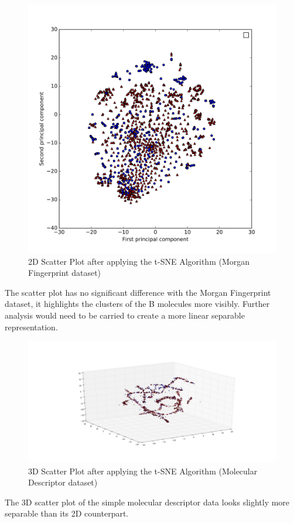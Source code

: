 \documentclass[a4paper,12pt]{report}
\begin{document}
		\begin{figure}[H]
			\centering
			\includegraphics[width=\textwidth,scale=1,totalheight=0.5\textheight]{images/scatter_tsne_mfps}
			\caption{2D Scatter Plot after applying the t-SNE Algorithm (Morgan Fingerprint dataset)}
			\label{fig:scatter_tsne_mfps_2D}
		\end{figure}
		The scatter plot has no significant difference with the Morgan Fingerprint dataset, it highlights the clusters of the B molecules more visibly. Further analysis would need to be carried to create a more linear separable representation.
		\begin{figure}[H]
			\centering
			\includegraphics[width=\textwidth,scale=1,totalheight=0.5\textheight]{images/scatter_tsne_3D}
			\caption{3D Scatter Plot after applying the t-SNE Algorithm (Molecular Descriptor dataset)}
			\label{fig:scatter_tsne_3D}
		\end{figure}
		The 3D scatter plot of the simple molecular descriptor data looks slightly more separable than its 2D counterpart.
		
\end{document}
